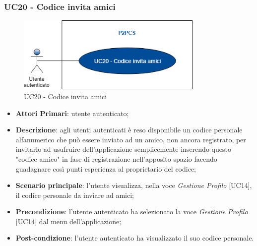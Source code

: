 \subsubsection{UC20 - Codice invita amici}
\begin{figure}[h]
	\includegraphics[width=9cm]{res/images/UC23Codiceamico.png}
	\centering
	\caption{UC20 - Codice invita amici}
\end{figure}
\begin{itemize}
	\item \textbf{Attori Primari}: utente autenticato;
	\item \textbf{Descrizione}: agli utenti autenticati è reso disponibile un codice personale alfanumerico che può essere inviato ad un amico, non ancora registrato, per invitarlo ad usufruire dell'applicazione semplicemente inserendo questo "codice amico" in fase di registrazione nell'apposito spazio facendo guadagnare così punti esperienza al proprietario del codice;
	\item \textbf{Scenario principale}: l'utente visualizza, nella voce \textit{Gestione Profilo} [UC14], il codice personale da inviare ad amici;
	\item \textbf{Precondizione}: l'utente autenticato ha selezionato la voce \textit{Gestione Profilo} [UC14] dal menu dell'applicazione;
	\item \textbf{Post-condizione}: l'utente autenticato ha visualizzato il suo codice personale. 
\end{itemize} 
